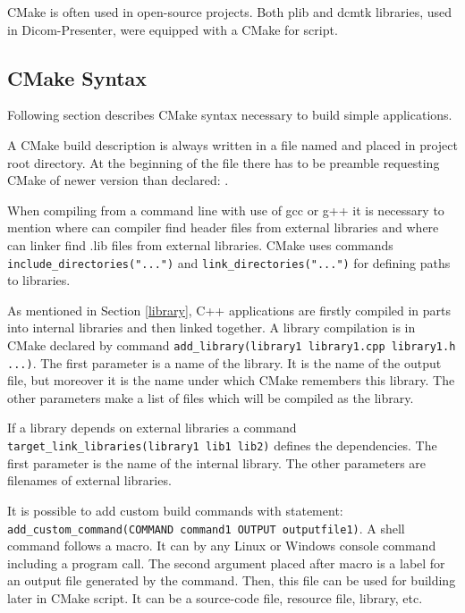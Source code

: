 CMake is often used in open-source projects. Both plib and dcmtk libraries, used in Dicom-Presenter, were equipped with a CMake for script.

\subsection{CMake Syntax}


Following section describes CMake syntax necessary to build simple applications. 

A CMake build description is always written in a file named  and placed in project root directory. At the beginning of the file there has to be preamble requesting CMake of newer version than declared: .

When compiling from a command line with use of gcc or g++ it is necessary to mention where can compiler find header files from external libraries and where can linker find .lib files from external libraries. CMake uses commands \texttt{include\-\_directories\-("...")} and \texttt{link\-\_directories\-("...")} for defining paths to libraries.

As mentioned in Section \ref{library}, C++ applications are firstly compiled in parts into internal libraries and then linked together. A library compilation is in CMake declared by command \texttt{add\-\_library\-(library1 library1.cpp library1.h ...)}. The first parameter is a name of the library. It is the name of the output file, but moreover it is the name under which CMake remembers this library. The other parameters make a list of files which will be compiled as the library.

If a library depends on external libraries a command \texttt{target\-\_link\-\_libraries\-(library1 lib1 lib2)} defines the dependencies. The first parameter is the name of the internal library. The other parameters are filenames of external libraries.

It is possible to add custom build commands with statement: {\tt add\-\_custom\-\_command\-(COMMAND command1 OUTPUT outputfile1)}. A shell command follows a  macro. It can by any Linux or Windows console command including a program call. The second argument placed after  macro is a label for an output file generated by the command. Then, this file can be used for building later in CMake script. It can be a source-code file, resource file, library, etc.




